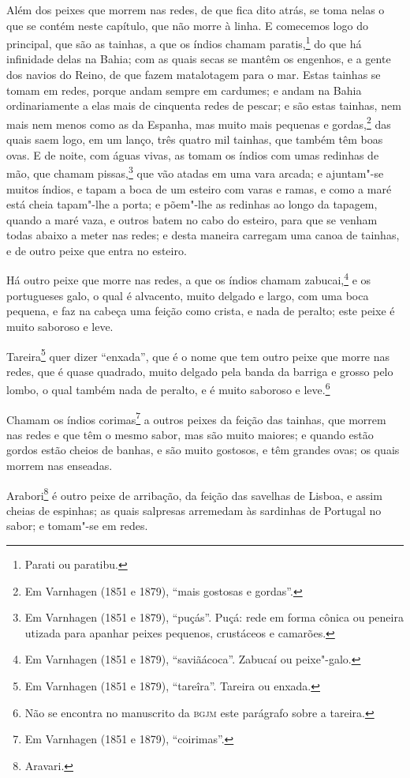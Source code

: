 Além dos peixes que morrem nas redes, de que fica dito atrás, se toma nelas o que se
contém neste capítulo, que não morre à linha. E comecemos logo do principal, que são as
tainhas, a que os índios chamam paratis,\footnote{ Parati ou paratibu.} do que há
infinidade delas na Bahia; com as quais secas se mantêm os engenhos, e a gente dos navios
do Reino, de que fazem matalotagem para o mar. Estas tainhas se tomam em redes, porque
andam sempre em cardumes; e andam na Bahia ordinariamente a elas mais de cinquenta redes
de pescar; e são estas tainhas, nem mais nem menos como as da Espanha, mas muito mais
pequenas e gordas,\footnote{ Em Varnhagen (1851 e 1879), ``mais gostosas e gordas''.} das
quais saem logo, em um lanço, três quatro mil tainhas, que também têm boas ovas. E de
noite, com águas vivas, as tomam os índios com umas redinhas de mão, que chamam
pissas,\footnote{ Em Varnhagen (1851 e 1879), ``puçás''. Puçá: rede em forma cônica ou
peneira utizada para apanhar peixes pequenos, crustáceos e camarões.} que vão atadas em
uma vara arcada; e ajuntam"-se muitos índios, e tapam a boca de um esteiro com varas e
ramas, e como a maré está cheia tapam"-lhe a porta; e põem"-lhe as redinhas ao longo da
tapagem, quando a maré vaza, e outros batem no cabo do esteiro, para que se venham todas
abaixo a meter nas redes; e desta maneira carregam uma canoa de tainhas, e de outro peixe
que entra no esteiro.

Há outro peixe que morre nas redes, a que os índios chamam zabucai,\footnote{ Em Varnhagen
(1851 e 1879), ``saviãácoca''. Zabucaí ou peixe"-galo.} e os portugueses galo, o qual é
alvacento, muito delgado e largo, com uma boca pequena, e faz na cabeça uma feição como
crista, e nada de peralto; este peixe é muito saboroso e leve.

Tareira\footnote{ Em Varnhagen (1851 e 1879), ``tareîra''. Tareira ou enxada.} quer dizer
``enxada'', que é o nome que tem outro peixe que morre nas redes, que é quase quadrado,
muito delgado pela banda da barriga e grosso pelo lombo, o qual também nada de peralto, e
é muito saboroso e leve.\footnote{ Não se encontra no manuscrito da \textsc{bgjm} este
parágrafo sobre a tareira.}

Chamam os índios corimas\footnote{ Em Varnhagen (1851 e 1879), ``coirimas''.} a outros
peixes da feição das tainhas, que morrem nas redes e que têm o mesmo sabor, mas são muito
maiores; e quando estão gordos estão cheios de banhas, e são muito gostosos, e têm grandes
ovas; os quais morrem nas enseadas.

Arabori\footnote{ Aravari.} é outro peixe de arribação, da feição das savelhas de Lisboa,
e assim cheias de espinhas; as quais salpresas arremedam às sardinhas de Portugal no
sabor; e tomam"-se em redes.

